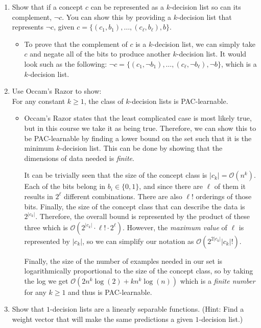 \begin{enumerate}
\item \relax[8 points] Show that if a concept $c$ can be represented
  as a $k$-decision list so can its complement, $\neg c$. You can show
  this by providing a $k$-decision list that represents $\neg c$,
  given $c = \{(c_{1},b_{1}), \ldots, (c_{\ell},b_{\ell}),b\}$.

\begin{itemize}
\item To prove that the complement of $c$ is a $k$-decision list, we can simply take $c$ and negate all of the bits to produce another $k$-decision list. It would look such as the following: $\neg c = \{(c_{1},\neg b_{1}), \ldots, (c_{\ell},\neg b_{\ell}),\neg b\}$, which is a $k$-decision list.
\end{itemize}
\item \relax[9 points] Use  Occam's Razor to show: \\
  For any constant $k \geq 1$, the class of $k$-decision lists is
  PAC-learnable.

\begin{itemize}
\item Occam's Razor states that the least complicated case is most likely true, but in this course we take it as being true. Therefore, we can show this to be PAC-learnable by finding a lower bound on the set such that it is the minimum $k$-decision list. This can be done by showing that the dimensions of data needed is {\em finite}.

It can be trivially seen that the size of the concept class is $\left| c_{k} \right| = \mathcal{O}\left( n^{k}\right)$. Each of the bits belong in $b_{i}\in \{ 0,1 \}$, and since there are $\ell$ of them it results in $2^{\ell}$ different combinations. There are also $\ell!$ orderings of those bits. Finally, the size of the concept class that can describe the data is $2^{\left| c_{k} \right|}$. Therefore, the overall bound is represented by the product of these three which is $\mathcal{O}\left( 2^{\left| c_{k} \right|}\cdot \ell!\cdot 2^{\ell} \right)$. However, the {\em maximum value} of $\ell$ is represented by $\left| c_{k} \right|$, so we can simplify our notation as $\mathcal{O}\left( 2^{2\left| c_{k}\right|}\left| c_{k} \right|!\right)$.

Finally, the size of the number of examples needed in our set is logarithmically proportional to the size of the concept class, so by taking the log we get $\mathcal{O}\left( 2n^{k}\log(2) + kn^{k}\log(n)\right)$ which is a {\em finite number} for any $k\geq 1$ and thus is PAC-learnable.
\end{itemize}
\item \relax[8 points] Show that $1$-decision lists are a linearly
  separable functions. (Hint: Find a weight vector that will make the
  same predictions a given $1$-decision list.)


\end{enumerate}
